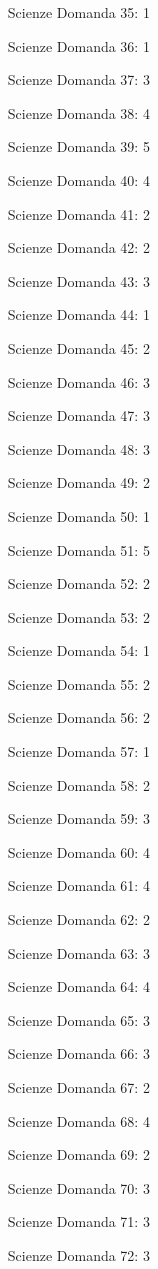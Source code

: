 \documentclass[20pt, a4paper]{article}
\begin{document}
\begin{itemize}[leftmargin=*]
\item [Scienze] Domanda 35: 1
\item [Scienze] Domanda 36: 1
\item [Scienze] Domanda 37: 3
\item [Scienze] Domanda 38: 4
\item [Scienze] Domanda 39: 5
\item [Scienze] Domanda 40: 4
\item [Scienze] Domanda 41: 2
\item [Scienze] Domanda 42: 2
\item [Scienze] Domanda 43: 3
\item [Scienze] Domanda 44: 1
\item [Scienze] Domanda 45: 2
\item [Scienze] Domanda 46: 3
\item [Scienze] Domanda 47: 3
\item [Scienze] Domanda 48: 3
\item [Scienze] Domanda 49: 2
\item [Scienze] Domanda 50: 1
\item [Scienze] Domanda 51: 5
\item [Scienze] Domanda 52: 2
\item [Scienze] Domanda 53: 2
\item [Scienze] Domanda 54: 1
\item [Scienze] Domanda 55: 2
\item [Scienze] Domanda 56: 2
\item [Scienze] Domanda 57: 1
\item [Scienze] Domanda 58: 2
\item [Scienze] Domanda 59: 3
\item [Scienze] Domanda 60: 4
\item [Scienze] Domanda 61: 4
\item [Scienze] Domanda 62: 2
\item [Scienze] Domanda 63: 3
\item [Scienze] Domanda 64: 4
\item [Scienze] Domanda 65: 3
\item [Scienze] Domanda 66: 3
\item [Scienze] Domanda 67: 2
\item [Scienze] Domanda 68: 4
\item [Scienze] Domanda 69: 2
\item [Scienze] Domanda 70: 3
\item [Scienze] Domanda 71: 3
\item [Scienze] Domanda 72: 3

\end{itemize}
\end{document}
